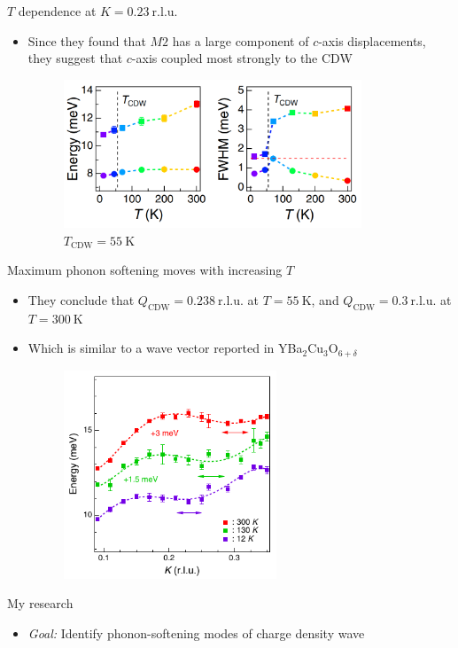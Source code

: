 \documentclass{beamer}
\begin{document}
\begin{frame}{$T$ dependence at $K = 0.23~\mathrm{r.l.u.}$}
\begin{itemize}
\item Since they found that $M2$ has a large component of $c$-axis displacements, they suggest that $c$-axis coupled most strongly to the CDW
\begin{figure}
\includegraphics[width=3.5in]{figs/exp_T_dependence.png}
\caption{\label{fig:exp_T_dependence} $T_{\text{CDW}} = 55~\mathrm{K}$}
\end{figure}
\end{itemize}
\end{frame}

\begin{frame}{Maximum phonon softening moves with increasing $T$}
\begin{itemize}
\item They conclude that $Q_{\text{CDW}} = 0.238~\mathrm{r.l.u.}$ at $T = 55~\mathrm{K}$, and $Q_{\text{CDW}} = 0.3~\mathrm{r.l.u.}$ at $T = 300~\mathrm{K}$
\item Which is similar to a wave vector reported in YBa$_2$Cu$_3$O$_{6 + \delta}$
\begin{figure}
\includegraphics[width=2.5in]{figs/exp_E_k_zoomed.pdf}
\caption{\label{fig:exp_E_k_zoomed} }
\end{figure}
\end{itemize}
\end{frame}

\begin{frame}{My research}
\begin{itemize}
\item \textit{Goal:} Identify phonon-softening modes of charge density wave
\end{itemize}
\end{frame}
\end{document}
